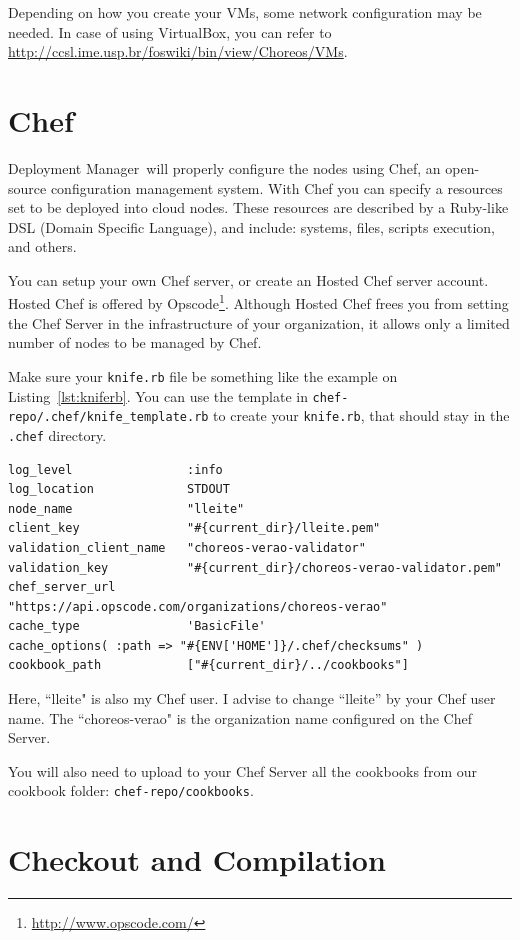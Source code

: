 \documentclass[a4paper, 10pt]{article}
\newcommand{\dm}{Deployment Manager}
\begin{document}
Depending on how you create your VMs, some network configuration may be needed. In case of using VirtualBox, you can refer to \url{http://ccsl.ime.usp.br/foswiki/bin/view/Choreos/VMs}.

\section{Chef}
\label{sec:chef}

\dm\ will properly configure the nodes using Chef, an open-source configuration management system. With Chef you can specify a resources set to be deployed into cloud nodes. These resources are described by a Ruby-like DSL (Domain Specific Language), and include: systems, files, scripts execution, and others.

You can setup your own Chef server, or create an Hosted Chef server account. Hosted Chef is offered by Opscode\footnote{\url{http://www.opscode.com/}}. Although Hosted Chef frees you from setting the Chef Server in the infrastructure of your organization, it allows only a limited number of nodes to be managed by Chef.

Make sure your \texttt{knife.rb} file be something like the example on Listing~\ref{lst:kniferb}. You can use the template in \texttt{chef-repo/.chef/knife\_template.rb} to create your \texttt{knife.rb}, that should stay in the \texttt{.chef} directory.

{\footnotesize
\begin{lstlisting}[caption=knife.rb example,label=lst:kniferb] 
log_level                :info 
log_location             STDOUT 
node_name                "lleite" 
client_key               "#{current_dir}/lleite.pem" 
validation_client_name   "choreos-verao-validator" 
validation_key           "#{current_dir}/choreos-verao-validator.pem" 
chef_server_url          "https://api.opscode.com/organizations/choreos-verao" 
cache_type               'BasicFile' 
cache_options( :path => "#{ENV['HOME']}/.chef/checksums" ) 
cookbook_path            ["#{current_dir}/../cookbooks"] 
\end{lstlisting}
}

Here, ``lleite" is also my Chef user. I advise to change ``lleite'' by your Chef user name.
The  ``choreos-verao" is the organization name configured on the Chef Server.

You will also need to upload to your Chef Server all the cookbooks from our cookbook folder: \texttt{chef-repo/cookbooks}.


\section{Checkout and Compilation}
\end{document}
